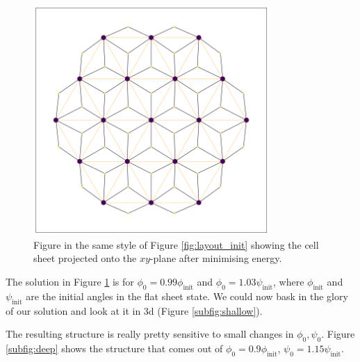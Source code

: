 \begin{figure}[htbp]
    \centering
    \includegraphics[width=0.8\textwidth]{layout_curved.png}
    \caption{Figure in the same style of Figure \ref{fig:layout_init} showing the cell sheet projected onto the $xy$-plane after minimising energy. }
    \label{fig:layout_curved}
\end{figure}

The solution in Figure \ref{fig:layout_curved} is for $\phi_0 = 0.99 \phi_{\text{init}}$ and $\phi_0 = 1.03 \psi_{\text{init}}$, where $\phi_{\text{init}}$ and $\psi_{\text{init}}$ are the initial angles in the flat sheet state. We could now bask in the glory of our solution and look at it in 3d (Figure \ref{subfig:shallow}).

The resulting structure is really pretty sensitive to small changes in $\phi_0, \psi_0$. Figure \ref{subfig:deep} shows the structure that comes out of $\phi_0 = 0.9 \phi_{\text{init}}$, $\psi_0 = 1.15\psi_{\text{init}}$. 


